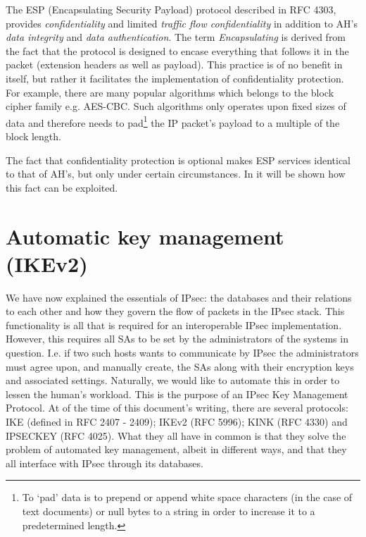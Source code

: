 \documentclass[final,a4paper,twoside,11pt,onecolumn]{report}
\begin{document}
The ESP (Encapsulating Security Payload) protocol described in RFC 4303\cite{rfc4303}, provides \emph{confidentiality} and limited \emph{traffic flow confidentiality} in addition to AH's \emph{data integrity} and \emph{data authentication}. The term \emph{Encapsulating} is derived from the fact that the protocol is designed to encase everything that follows it in the packet (extension headers as well as payload). This practice is of no benefit in itself, but rather it facilitates the implementation of confidentiality protection. For example, there are many popular algorithms which belongs to the block cipher family e.g. AES-CBC. Such algorithms only operates upon fixed sizes of data and therefore needs to pad\footnote{To `pad' data is to prepend or append white space characters (in the case of text documents) or null bytes to a string in order to increase it to a predetermined length.} the IP packet's payload to a multiple of the block length.

The fact that confidentiality protection is optional makes ESP services identical to that of AH's, but only under certain circumstances. In  it will be shown how this fact can be exploited.


% 
% 

\label{sec:ikebg}
\section{Automatic key management (IKEv2)}%
We have now explained the essentials of IPsec: the databases and their relations to each other and how they govern the flow of packets in the IPsec stack. This functionality is all that is required for an interoperable IPsec implementation. However, this requires all SAs to be set by the administrators of the systems in question. I.e. if two such hosts wants to communicate by IPsec the administrators must agree upon, and manually create, the SAs along with their encryption keys and associated settings. Naturally, we would like to automate this in order to lessen the human's workload. This is the purpose of an IPsec Key Management Protocol. At of the time of this document's writing, there are several protocols: IKE (defined in RFC 2407 - 2409)\cite{rfc2407}\cite{rfc2408}\cite{rfc2409}; IKEv2 (RFC 5996)\cite{rfc5996}; KINK (RFC 4330)\cite{rfc4330} and IPSECKEY (RFC 4025)\cite{rfc4025}. What they all have in common is that they solve the problem of automated key management, albeit in different ways, and that they all interface with IPsec through its databases.
\end{document}
